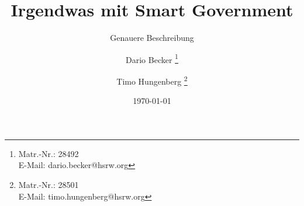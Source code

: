 \titlehead{
{\Large Hochschule Rhein Waal}\\
Fakultät für Kommunikation und Umwelt\\
Friedrich-Heinrich-Allee 25\\
47475 Kamp-Lintfort
}

\subject{
Abschlussbericht\\
\normalfont
im Modul New Public Management\\
}

\title{Irgendwas mit Smart Government}

\subtitle{Genauere Beschreibung}
\author{
Dario Becker
\thanks{
 Matr.-Nr.: 28492\\
E-Mail: dario.becker@hsrw.org}
\and Timo Hungenberg
\thanks{
Matr.-Nr.: 28501\\
E-Mail: timo.hungenberg@hsrw.org}
}

\date{\today}


\maketitle
